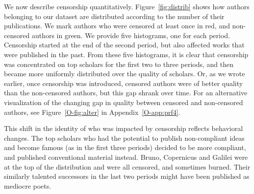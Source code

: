 We now describe  censorship quantitatively. Figure~\ref{fig:distrib} shows how authors belonging to our dataset are distributed according to the number of their publications. We mark authors who were censored at least once in red, and non-censored authors in green. We provide five histograms, one for each period. Censorship started at the end of the second period, but also affected works that were published in the past. From these five histograms, it is clear that censorship was concentrated on top scholars for the first two to three periods, and then became more uniformly distributed over the quality of scholars. Or, as we wrote earlier, once censorship was introduced, censored authors were of better quality than the non-censored authors, but this gap shrank over time. For an alternative visualization of the changing gap in quality between censored and non-censored authors, see Figure~\ref{O-fig:alter} in Appendix~\ref{O-app:prf4}.

This shift in the identity of who was impacted by censorship reflects behavioral changes. The top scholars who had the potential to publish non-compliant ideas and become famous (as in the first three periods) decided to be more compliant, and published conventional material instead. Bruno, Copernicus and Galilei were at the top of the distribution and were all censored, and sometimes burned. Their similarly talented successors in the last two periods might have been published as mediocre poets.




